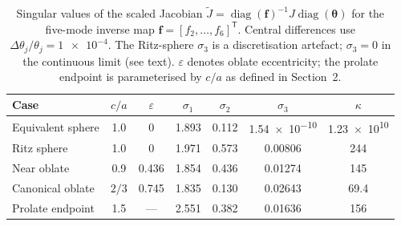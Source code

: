 \begin{table}[t]
  \centering
  \small
  \caption{Singular values of the scaled Jacobian
  $\widetilde{J}=\operatorname{diag}(\mathbf{f})^{-1}J
  \operatorname{diag}(\boldsymbol{\theta})$ for the five-mode inverse map
  $\mathbf{f}=[f_2,\ldots,f_6]^\mathsf{T}$.  Central differences use
  $\Delta\theta_j/\theta_j=\num{1e-4}$.  The Ritz-sphere $\sigma_3$ is a
  discretisation artefact; $\sigma_3=0$ in the continuous limit (see text).
  $\varepsilon$ denotes oblate eccentricity; the prolate endpoint is
  parameterised by $c/a$ as defined in Section~2.}
  \label{tab:singular-values}
  \begin{tabular}{@{}lcccccc@{}}
    \toprule
    Case & $c/a$ & $\varepsilon$ & $\sigma_1$ & $\sigma_2$ & $\sigma_3$ & $\kappa$ \\
    \midrule
    Equivalent sphere & \num{1.0} & \num{0} &
    \num{1.893} & \num{0.112} & \num{1.54e-10} & \num{1.23e10} \\
    Ritz sphere & \num{1.0} & \num{0} &
    \num{1.971} & \num{0.573} & \num{0.00806} & \num{244} \\
    Near oblate & \num{0.9} & \num{0.436} &
    \num{1.854} & \num{0.436} & \num{0.01274} & \num{145} \\
    Canonical oblate & $2/3$ & \num{0.745} &
    \num{1.835} & \num{0.130} & \num{0.02643} & \num{69.4} \\
    Prolate endpoint & \num{1.5} & --- &
    \num{2.551} & \num{0.382} & \num{0.01636} & \num{156} \\
    \bottomrule
  \end{tabular}
\end{table}

